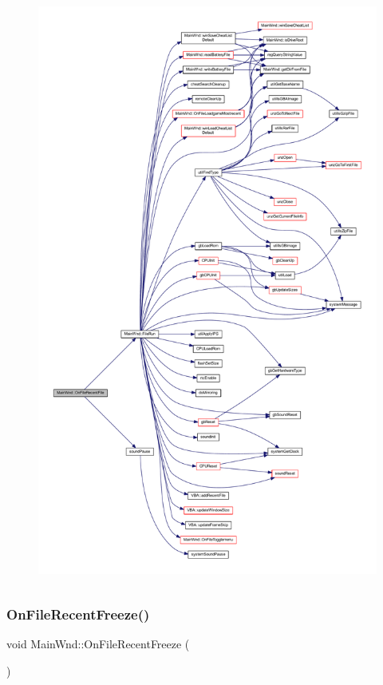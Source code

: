 \begin{figure}[H]
\begin{center}
\leavevmode
\includegraphics[height=550pt]{class_main_wnd_a0d7f7d468e486be90f1b6771bff84846_cgraph}
\end{center}
\end{figure}
\mbox{\label{class_main_wnd_a7ea11eb4bb58a99c3aa2a39276c24864}} 
\subsubsection{\texorpdfstring{On\+File\+Recent\+Freeze()}{OnFileRecentFreeze()}}
{\footnotesize\ttfamily void Main\+Wnd\+::\+On\+File\+Recent\+Freeze (\begin{DoxyParamCaption}{ }\end{DoxyParamCaption})\hspace{0.3cm}{\ttfamily [protected]}}



